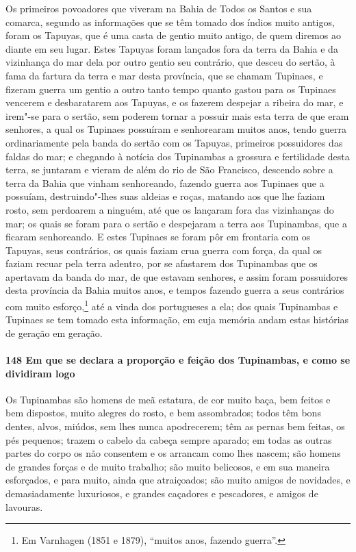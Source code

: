 Os primeiros povoadores que viveram na Bahia de Todos os Santos e sua comarca, segundo as
informações que se têm tomado dos índios muito antigos, foram os Tapuyas, que é uma casta
de gentio muito antigo, de quem diremos ao diante em seu lugar. Estes Tapuyas foram
lançados fora da terra da Bahia e da vizinhança do mar dela por outro gentio seu
contrário, que desceu do sertão, à fama da fartura da terra e mar desta província, que se
chamam Tupinaes, e fizeram guerra um gentio a outro tanto tempo quanto gastou para os
Tupinaes vencerem e desbaratarem aos Tapuyas, e os fazerem despejar a ribeira do mar, e
irem"-se para o sertão, sem poderem tornar a possuir mais esta terra de que eram senhores,
a qual os Tupinaes possuíram e senhorearam muitos anos, tendo guerra ordinariamente pela
banda do sertão com os Tapuyas, primeiros possuidores das faldas do mar; e chegando à
notícia dos Tupinambas a grossura e fertilidade desta terra, se juntaram e vieram de além
do rio de São Francisco, descendo sobre a terra da Bahia que vinham senhoreando, fazendo
guerra aos Tupinaes que a possuíam, destruindo"-lhes suas aldeias e roças, matando aos que
lhe faziam rosto, sem perdoarem a ninguém, até que os lançaram fora das vizinhanças do
mar; os quais se foram para o sertão e despejaram a terra aos Tupinambas, que a ficaram
senhoreando. E estes Tupinaes se foram pôr em frontaria com os Tapuyas, seus contrários,
os quais faziam crua guerra com força, da qual os faziam recuar pela terra adentro, por se
afastarem dos Tupinambas que os apertavam da banda do mar, de que estavam senhores, e
assim foram possuidores desta província da Bahia muitos anos, e tempos fazendo guerra a
seus contrários com muito esforço,\footnote{ Em Varnhagen (1851 e 1879), ``muitos anos,
fazendo guerra''.} até a vinda dos portugueses a ela; dos quais Tupinambas e Tupinaes se
tem tomado esta informação, em cuja memória andam estas histórias de geração em geração.

\paragraph{148 Em que se declara a proporção e feição dos Tupinambas, e como se dividiram
logo}

Os Tupinambas são homens de meã estatura, de cor muito baça, bem feitos e bem dispostos,
muito alegres do rosto, e bem assombrados; todos têm bons dentes, alvos, miúdos, sem lhes
nunca apodrecerem; têm as pernas bem feitas, os pés pequenos; trazem o cabelo da cabeça
sempre aparado; em todas as outras partes do corpo os não consentem e os arrancam como
lhes nascem; são homens de grandes forças e de muito trabalho; são muito belicosos, e em
sua maneira esforçados, e para muito, ainda que atraiçoados; são muito amigos de
novidades, e demasiadamente luxuriosos, e grandes caçadores e pescadores, e amigos de
lavouras.

